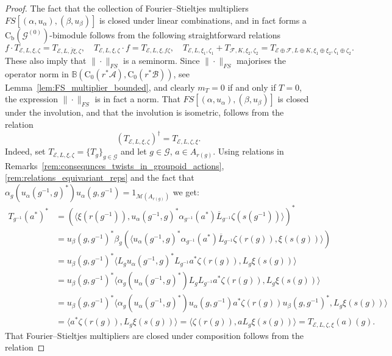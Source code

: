 \documentclass[11 pt, leqno]{amsart}
\numberwithin{equation}{section}
\theoremstyle{plain}
\theoremstyle{definition}
\newcommand*{\contz}{\mathrm{C_0}}%
\newcommand*{\contb}{\mathrm{C_b}}%
\renewcommand{\star}{*}
\newcommand{\B}{\mathcal B}
\newcommand{\BB}{\mathbb B}
\newcommand{\M}{\mathcal M}
\newcommand{\G}{\mathcal G} %
\newcommand{\EE}{\mathcal E}
\newcommand{\FF}{\mathcal F}
\newcommand{\A}{\mathcal A}
\begin{document}
\begin{proof} 
The fact that the collection of Fourier--Stieltjes multipliers $FS[(\alpha,u_{\alpha}),(\beta,u_{\beta})]$ is closed under linear combinations, and in fact forms a $\contb(\G^{(0)})$-bimodule follows from the following straightforward relations
\[
    f \cdot T_{\EE,L,\xi,\zeta}= T_{\EE,L,\overline{f}\xi,\zeta}, \quad 
    T_{\EE,L,\xi,\zeta}\cdot f= T_{\EE,L,\xi,f\zeta} , \quad 
    T_{\EE,L,\xi_1,\zeta_1}+T_{\FF,K,\xi_2,\zeta_2} = T_{\EE\oplus \FF,L\oplus K,\xi_1\oplus \xi_2,\zeta_1\oplus \zeta_2}.
\]
These also imply that $\|\cdot\|_{FS}$ is a seminorm. 
Since $\|\cdot\|_{FS}$ majorises the operator norm in $\BB(\contz(r^*\A),\contz(r^*\B))$, see Lemma~\ref{lem:FS_multiplier_bounded}, and clearly $m_T=0$ if and only if $T=0$, the expression $\|\cdot\|_{FS}$ is in fact a norm.  
That $FS[(\alpha,u_{\alpha}),(\beta,u_{\beta})]$ is closed
under the involution, and that the involution is isometric, follows from the relation
\[ 
    (T_{\EE,L,\xi,\zeta})^\dagger = T_{\EE,L,\zeta,\xi}.
\]
Indeed, set $ T_{\EE,L,\xi,\zeta}=\{T_{g}\}_{g\in \G}$ and let  $g \in \G$, $a\in A_{r(g)}$. 
Using relations in Remarks~\ref{rem:consequnces_twists_in_groupoid_actions}, \ref{rem:relations_equivariant_reps} and the fact that $\alpha_g(u_\alpha(g^{-1},g)^*) u_\alpha(g,g^{-1}) =1_{\M(A_{r(g)})}$ we get: 
\[
\begin{split}
    T_{g^{-1}}(a^\star)^\star &= \left(\langle \xi(r(g^{-1})), u_\alpha(g^{-1},g)^* \alpha_{g^{-1}}(a^*) \overline{L}_{g^{-1}}\zeta(s(g^{-1}))\rangle \right)^{\star} \\
        &= u_\beta(g,g^{-1})^* \beta_g \left( \langle u_\alpha(g^{-1},g)^* \alpha_{g^{-1}}(a^*)  \overline{L}_{g^{-1}}\zeta(r(g)),   \xi(s(g)) \rangle \right) \\ 
        &= u_\beta(g,g^{-1})^* \langle  L_g u_\alpha(g^{-1},g)^* L_{g^{-1}}a^*\zeta(r(g)), L_g  \xi(s(g))\rangle \\
        &= u_\beta(g,g^{-1})^* \langle \alpha_g(u_\alpha(g^{-1},g)^*) L_g L_{g^{-1}}a^*\zeta(r(g)), L_g  \xi(s(g))\rangle \\
        &= u_\beta(g,g^{-1})^* \langle \alpha_g(u_\alpha(g^{-1},g)^*) u_\alpha(g,g^{-1}) a^*\zeta(r(g)) u_\beta(g,g^{-1})^*, L_g  \xi(s(g))\rangle \\
        &= \langle a^*\zeta(r(g)), L_g  \xi(s(g))\rangle  =  \langle \zeta(r(g)), aL_g  \xi(s(g))\rangle = T_{\EE,L,\zeta,\xi}(a)(g).
\end{split}
\]
That Fourier--Stieltjes multipliers are closed under composition follows from the relation

\end{proof}
\end{document}
